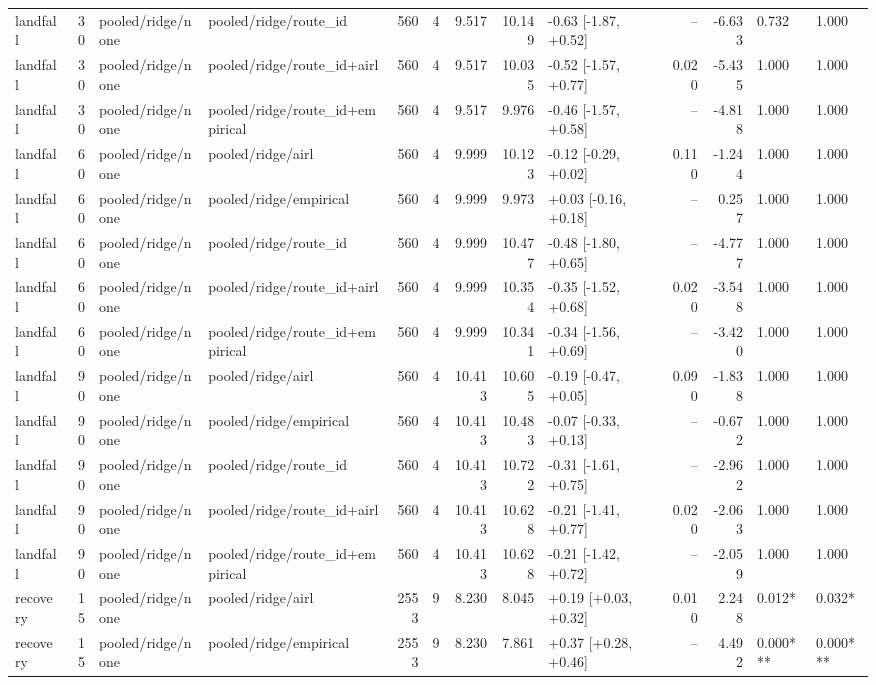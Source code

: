 \begin{tabular}{lrllrrrrlrrll}
landfall & 30 & pooled/ridge/none & pooled/ridge/route_id & 560 & 4 & 9.517 & 10.149 & -0.63 [-1.87, +0.52] & -- & -6.633 & 0.732 & 1.000 \\
landfall & 30 & pooled/ridge/none & pooled/ridge/route_id+airl & 560 & 4 & 9.517 & 10.035 & -0.52 [-1.57, +0.77] & 0.020 & -5.435 & 1.000 & 1.000 \\
landfall & 30 & pooled/ridge/none & pooled/ridge/route_id+empirical & 560 & 4 & 9.517 & 9.976 & -0.46 [-1.57, +0.58] & -- & -4.818 & 1.000 & 1.000 \\
landfall & 60 & pooled/ridge/none & pooled/ridge/airl & 560 & 4 & 9.999 & 10.123 & -0.12 [-0.29, +0.02] & 0.110 & -1.244 & 1.000 & 1.000 \\
landfall & 60 & pooled/ridge/none & pooled/ridge/empirical & 560 & 4 & 9.999 & 9.973 & +0.03 [-0.16, +0.18] & -- & 0.257 & 1.000 & 1.000 \\
landfall & 60 & pooled/ridge/none & pooled/ridge/route_id & 560 & 4 & 9.999 & 10.477 & -0.48 [-1.80, +0.65] & -- & -4.777 & 1.000 & 1.000 \\
landfall & 60 & pooled/ridge/none & pooled/ridge/route_id+airl & 560 & 4 & 9.999 & 10.354 & -0.35 [-1.52, +0.68] & 0.020 & -3.548 & 1.000 & 1.000 \\
landfall & 60 & pooled/ridge/none & pooled/ridge/route_id+empirical & 560 & 4 & 9.999 & 10.341 & -0.34 [-1.56, +0.69] & -- & -3.420 & 1.000 & 1.000 \\
landfall & 90 & pooled/ridge/none & pooled/ridge/airl & 560 & 4 & 10.413 & 10.605 & -0.19 [-0.47, +0.05] & 0.090 & -1.838 & 1.000 & 1.000 \\
landfall & 90 & pooled/ridge/none & pooled/ridge/empirical & 560 & 4 & 10.413 & 10.483 & -0.07 [-0.33, +0.13] & -- & -0.672 & 1.000 & 1.000 \\
landfall & 90 & pooled/ridge/none & pooled/ridge/route_id & 560 & 4 & 10.413 & 10.722 & -0.31 [-1.61, +0.75] & -- & -2.962 & 1.000 & 1.000 \\
landfall & 90 & pooled/ridge/none & pooled/ridge/route_id+airl & 560 & 4 & 10.413 & 10.628 & -0.21 [-1.41, +0.77] & 0.020 & -2.063 & 1.000 & 1.000 \\
landfall & 90 & pooled/ridge/none & pooled/ridge/route_id+empirical & 560 & 4 & 10.413 & 10.628 & -0.21 [-1.42, +0.72] & -- & -2.059 & 1.000 & 1.000 \\
recovery & 15 & pooled/ridge/none & pooled/ridge/airl & 2553 & 9 & 8.230 & 8.045 & +0.19 [+0.03, +0.32] & 0.010 & 2.248 & 0.012* & 0.032* \\
recovery & 15 & pooled/ridge/none & pooled/ridge/empirical & 2553 & 9 & 8.230 & 7.861 & +0.37 [+0.28, +0.46] & -- & 4.492 & 0.000*** & 0.000*** \\

\end{tabular}
